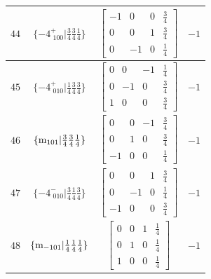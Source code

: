 \documentclass[fleqn,8pt]{jsarticle}
\begin{document}
\begin{longtable}{cccc}
$ 44 $ & $ \{-4^{+}_{\,\,100}|\frac{3}{4} \frac{3}{4} \frac{1}{4}\} $ & $ \begin{bmatrix} -1 & 0 & 0 & \frac{3}{4} \\ 0 & 0 & 1 & \frac{3}{4} \\ 0 & -1 & 0 & \frac{1}{4} \end{bmatrix} $ & $ -1 $ \\ \hline
$ 45 $ & $ \{-4^{+}_{\,\,010}|\frac{1}{4} \frac{3}{4} \frac{3}{4}\} $ & $ \begin{bmatrix} 0 & 0 & -1 & \frac{1}{4} \\ 0 & -1 & 0 & \frac{3}{4} \\ 1 & 0 & 0 & \frac{3}{4} \end{bmatrix} $ & $ -1 $ \\ \hline
$ 46 $ & $ \{{\rm m}_{101}|\frac{3}{4} \frac{3}{4} \frac{1}{4}\} $ & $ \begin{bmatrix} 0 & 0 & -1 & \frac{3}{4} \\ 0 & 1 & 0 & \frac{3}{4} \\ -1 & 0 & 0 & \frac{1}{4} \end{bmatrix} $ & $ -1 $ \\ \hline
$ 47 $ & $ \{-4^{-}_{\,\,010}|\frac{3}{4} \frac{1}{4} \frac{3}{4}\} $ & $ \begin{bmatrix} 0 & 0 & 1 & \frac{3}{4} \\ 0 & -1 & 0 & \frac{1}{4} \\ -1 & 0 & 0 & \frac{3}{4} \end{bmatrix} $ & $ -1 $ \\ \hline
$ 48 $ & $ \{{\rm m}_{-101}|\frac{1}{4} \frac{1}{4} \frac{1}{4}\} $ & $ \begin{bmatrix} 0 & 0 & 1 & \frac{1}{4} \\ 0 & 1 & 0 & \frac{1}{4} \\ 1 & 0 & 0 & \frac{1}{4} \end{bmatrix} $ & $ -1 $ \\
\end{longtable}
\end{document}
